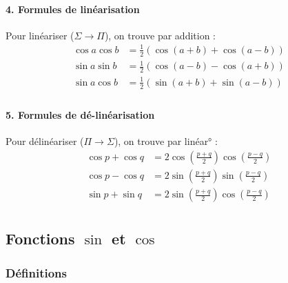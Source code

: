 \documentclass{report}
\begin{document}
        \paragraph{4. Formules de linéarisation}
        Pour linéariser ($\Sigma\to\Pi$), on trouve par addition : 
        \begin{align*}
          \cos a \cos b &= \frac{1}{2} \left(\cos(a+b)+ \cos(a-b)\right)\\
          \sin a \sin b &= \frac{1}{2} \left(\cos(a-b)- \cos(a+b)\right)\\
          \sin a \cos b &= \frac{1}{2} \left(\sin(a+b)+ \sin(a-b)\right)\\
        \end{align*}

        \paragraph{5. Formules de dé-linéarisation}
        Pour délinéariser ($\Pi\to\Sigma$), on trouve par linéar° : 
        \begin{align*}
          \cos p +\cos q &= 2 \cos(\frac{p+q}{2})\cos(\frac{p-q}{2})\\
          \cos p -\cos q &= 2 \sin(\frac{p+q}{2})\sin(\frac{p-q}{2})\\
          \sin p +\sin q &= 2 \sin(\frac{p+q}{2})\cos(\frac{p-q}{2})\\
        \end{align*}

        \iffalse\paragraph{4. Valeurs remarquables}
        \[
        \cos\left( \frac{\pi}{4} \right) = \sin\left( \frac{\pi}{4} \right) = \frac{\sqrt{2}}{2}
        \qquad
        \cos\left( \frac{\pi}{6} \right) = \frac{\sqrt{3}}{2},\quad \sin\left( \frac{\pi}{6} \right) = \frac{1}{2}
        \]
        \[
        \cos\left( \frac{\pi}{3} \right) = \frac{1}{2},\quad \sin\left( \frac{\pi}{3} \right) = \frac{\sqrt{3}}{2}
        \]\fi

      \subsection{Fonctions $\sin$ et $\cos$}

        \subsubsection{Définitions}
\end{document}
